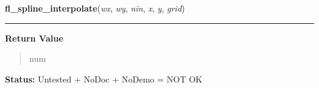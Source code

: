     \label{xformslib:library:fl_spline_interpolate}

    \vspace{0.5ex}

\hspace{.8\funcindent}\begin{boxedminipage}{\funcwidth}

    \raggedright \textbf{fl\_spline\_interpolate}(\textit{wx}, \textit{wy}, \textit{nin}, \textit{x}, \textit{y}, \textit{grid})

    \vspace{-1.5ex}

    \rule{\textwidth}{0.5\fboxrule}
\setlength{\parskip}{2ex}
\setlength{\parskip}{1ex}
      \textbf{Return Value}
    \vspace{-1ex}

      \begin{quote}
      num

      \end{quote}

\textbf{Status:} Untested + NoDoc + NoDemo = NOT OK



    \end{boxedminipage}

    \label{xformslib:library:fl_set_xyplot_symbol}

    \vspace{0.5ex}

